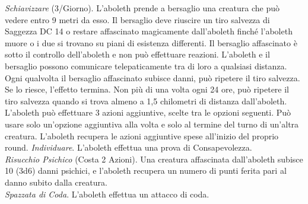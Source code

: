 \begin{multicols}{2}
\textit{Schiavizzare} (3/Giorno). L’aboleth prende a bersaglio una creatura che può vedere entro 9 metri da esso. Il bersaglio deve riuscire un tiro salvezza di Saggezza DC 14 o restare affascinato magicamente dall’aboleth finché l’aboleth muore o i due si trovano su piani di esistenza differenti. Il bersaglio affascinato è sotto il controllo dell’aboleth e non può effettuare reazioni. L’aboleth e il bersaglio possono comunicare telepaticamente tra di loro a qualsiasi distanza.  Ogni qualvolta il bersaglio affascinato subisce danni, può ripetere il tiro salvezza. Se lo riesce, l’effetto termina. Non più di una volta ogni 24 ore, può ripetere il tiro salvezza quando si trova almeno a 1,5 chilometri di distanza dall’aboleth.\\
L’aboleth può effettuare 3 azioni aggiuntive, scelte tra le opzioni seguenti. Può usare solo un’opzione aggiuntiva alla volta e solo al termine del turno di un’altra creatura. L’aboleth recupera le azioni aggiuntive spese all’inizio del proprio round.
\textit{Individuare}. L’aboleth effettua una prova di Consapevolezza.\\
\textit{Risucchio Psichico} (Costa 2 Azioni). Una creatura affascinata dall’aboleth subisce 10 (3d6) danni psichici, e l’aboleth recupera un numero di punti ferita pari al danno subito dalla creatura.\\
\textit{Spazzata di Coda}. L’aboleth effettua un attacco di coda.  \\


\end{multicols}
